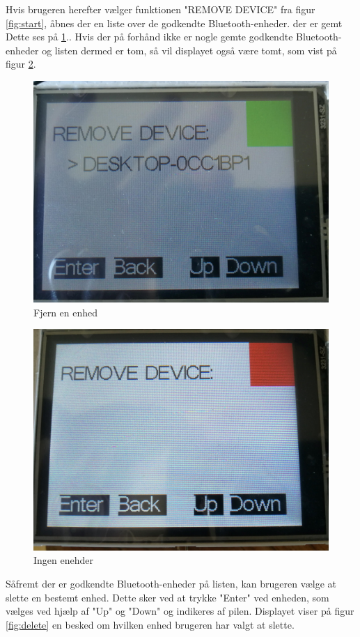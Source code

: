 Hvis brugeren herefter vælger funktionen "REMOVE DEVICE" fra figur \ref{fig:start}, åbnes der en liste over de godkendte Bluetooth-enheder. der er gemt Dette ses på \ref{fig:remove}.. Hvis der på forhånd ikke er nogle gemte godkendte Bluetooth-enheder og listen dermed er tom, så vil displayet også være tomt, som vist på figur \ref{fig:noDevices}. 
\begin{figure}[H]
	\centering
	\includegraphics[width = 300 pt]{Img/remove.jpg}
	\caption{Fjern en enhed}
	\label{fig:remove}
\end{figure}
\begin{figure}[H]
	\centering
	\includegraphics[width = 300 pt]{Img/noDevice.jpg}
	\caption{Ingen enehder}
	\label{fig:noDevices}
\end{figure}
Såfremt der er godkendte Bluetooth-enheder på listen, kan brugeren vælge at slette en bestemt enhed. Dette sker ved at trykke "Enter" ved enheden, som vælges ved hjælp af "Up" og "Down" og indikeres af pilen. Displayet viser på figur \ref{fig:delete} en besked om hvilken enhed brugeren har valgt at slette. 

